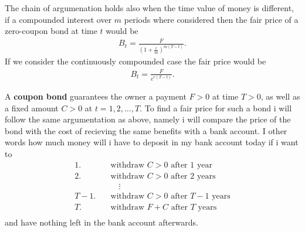 \documentclass{article}
\theoremstyle{definition}
\numberwithin{equation}{section}
\begin{document}
The chain of argumenation holds also when the time value of money is different, if a compounded interest over $m$ periods where considered then the fair price of a zero-coupon bond at time $t$ would be
\begin{align}
    B_t = \frac{F}{\left(1 + \frac{r}{m}\right)^{m(T - t)}}.
\end{align}
If we consider the continuously compounded case the fair price would be
\begin{align}
    B_t = \frac{F}{e^{r(T -t)}}.
\end{align}

A \textbf{coupon bond} guarantees the owner a payment $F > 0$ at time $T > 0$, as well as a fixed amount $C > 0$ at $t = 1,2,\ldots,T$.
To find a fair price for such a bond i will follow the same argumentation as above, namely i will compare the price of the bond with the cost of recieving the same benefits with a bank account.
I other words how much money will i have to deposit in my bank account today if i want to
\begin{align}
    \text{1.} \quad &\text{withdraw $C > 0$ after 1 year} \\
    \text{2.} \quad &\text{withdraw $C > 0$ after 2 years} \\
    &\quad \vdots \\
    \text{$T-1$.} \quad &\text{withdraw $C > 0$ after $T-1$ years} \\
    \text{$T$.} \quad &\text{withdraw $F + C$ after $T$ years} \\
\end{align}
and have nothing left in the bank account afterwards.
\end{document}
